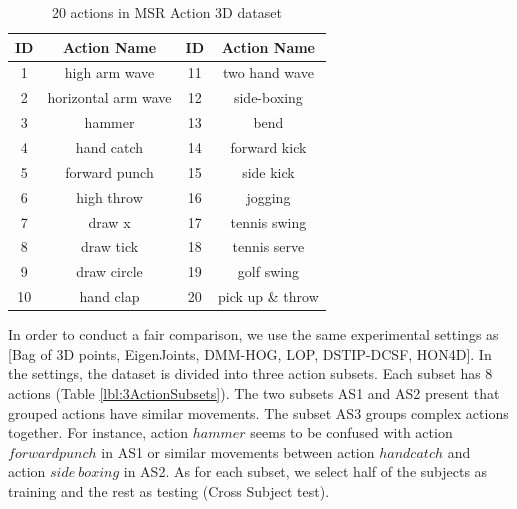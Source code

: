 \documentclass[review]{elsarticle}
\begin{document}
\begin{table}[H]
	\begin{center}
		\begin{tabular}{c|c|c|c}
		
		  {\bf   ID  } & {\bf Action Name} &   {\bf   ID  } & {\bf Action Name} \\
		\hline
		             1 &  high arm wave &             11 &  two hand wave \\
		
		             2 & horizontal arm wave &             12 &    side-boxing \\
		
		             3 &         hammer &             13 &           bend \\
		
		             4 &     hand catch &             14 &   forward kick \\
		
		             5 &  forward punch &             15 &      side kick \\
		
		             6 &     high throw &             16 &        jogging \\
		
		             7 &         draw x &             17 &   tennis swing \\
		
		             8 &      draw tick &             18 &   tennis serve \\
		
		             9 &    draw circle &             19 &     golf swing \\
		
		            10 &      hand clap &             20 & pick up \& throw \\
		
		\end{tabular}
	\end{center}
	\caption{\label{lbl:20actions}20 actions in MSR Action 3D dataset}
\end{table}

In order to conduct a fair comparison, we use the same experimental settings as [Bag of 3D points, EigenJoints, DMM-HOG, LOP, DSTIP-DCSF, HON4D]. In the settings, the dataset is divided into three action subsets. Each subset has 8 actions (Table \ref{lbl:3ActionSubsets}). The two subsets AS1 and AS2 present that grouped actions have similar movements. The subset AS3 groups complex actions together. For instance, action $hammer$ seems to be confused with action $forward punch$ in AS1 or similar movements between action $hand catch$ and action $side\ boxing$ in AS2. As for each subset, we select half of the subjects as training and the rest as testing (Cross Subject test).
\end{document}
